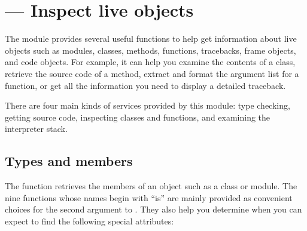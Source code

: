 \section{ ---
         Inspect live objects}



The  module provides several useful functions
to help get information about live objects such as modules,
classes, methods, functions, tracebacks, frame objects, and
code objects.  For example, it can help you examine the
contents of a class, retrieve the source code of a method,
extract and format the argument list for a function, or
get all the information you need to display a detailed traceback.

There are four main kinds of services provided by this module:
type checking, getting source code, inspecting classes
and functions, and examining the interpreter stack.

\subsection{Types and members
            \label{inspect-types}}

The  function retrieves the members
of an object such as a class or module.
The nine functions whose names begin with ``is'' are mainly
provided as convenient choices for the second argument to
.  They also help you determine when
you can expect to find the following special attributes:

